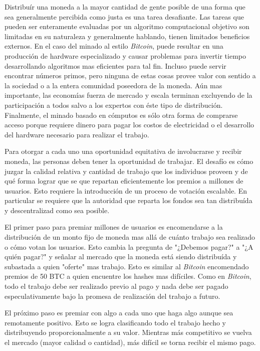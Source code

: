 \documentclass[a4paper,titlepage,final]{article}
\begin{document}
Distribuír una moneda a la mayor cantidad de gente posible de una forma que sea generalmente percibida como justa es una tarea desafiante. Las tareas que pueden ser enteramente evaluadas por un algoritmo computacional objetivo son limitadas en su naturaleza y generalmente hablando, tienen limitados beneficios externos. En el caso del minado al estilo \textit{Bitcoin}, puede resultar en una producción de hardware especializado y causar problemas para invertir tiempo desarrollando algoritmos mas eficientes para tal fin. Incluso puede servir encontrar números primos, pero ninguna de estas cosas provee valor con sentido a la sociedad o a la entera comunidad poseedora de la moneda. Aún mas importante, las economías fuerza de mercado y escala terminan excluyendo de la participación a todos salvo a los expertos con éste tipo de distribución. Finalmente, el minado basado en cómputos es sólo otra forma de comprarse acceso porque requiere dinero para pagar los costos de electricidad o el desarrollo del hardware necesario para realizar el trabajo.

Para otorgar a cada uno una oportunidad equitativa de involucrarse y recibir moneda, las personas deben tener la oportunidad de trabajar. El desafío es cómo juzgar la calidad relativa y cantidad de trabajo que los individuos proveen y de qué forma lograr que se que repartan eficientemente los premios a millones de usuarios. Esto requiere la introducción de un proceso de votación escalable. En particular se requiere que la autoridad que reparta los fondos sea tan distribuída y descentralizad como sea posible.

El primer paso para premiar millones de usuarios es encomendarse a la distribución de un monto fijo de moneda mas allá de cuánto trabajo sea realizado o cómo votan los usuarios. Esto cambia la pregunta de "¿Debemos pagar?" a "¿A quién pagar?" y señalar al mercado que la moneda está siendo distribuída y subastada a quien "oferte" mas trabajo. Esto es similar al \textit{Bitcoin} encomendado premios de 50 BTC a quien encuentre los hashes mas difíciles. Como en \textit{Bitcoin}, todo el trabajo debe ser realizado previo al pago y nada debe ser pagado especulativamente bajo la promesa de realización del trabajo a futuro.

El próximo paso es premiar con algo a cada uno que haga algo aunque sea remotamente positivo. Esto se logra clasificando todo el trabajo hecho y distribuyendo proporcionalmente a su valor. Mientras más competitivo se vuelva el mercado (mayor calidad o cantidad), más difícil se torna recibir el mismo pago.
\end{document}
